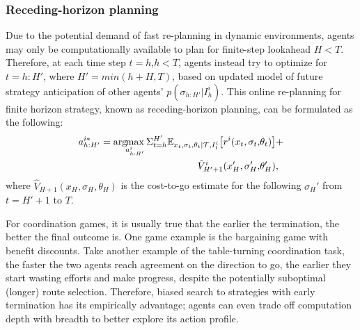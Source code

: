 \documentclass[letterpaper, 10 pt, conference]{ieeeconf}  %
\newcommand{\argmax}{\arg\!\!\max}
\begin{document}
\subsubsection{Receding-horizon planning}\label{sec:receding}
Due to the potential demand of fast re-planning in dynamic environments, agents may only be computationally available to plan for finite-step lookahead $H<T$. Therefore, at each time step $t=h$,$h<T$, agents instead try to optimize for $t=h:H'$, where $H'=min(h+H,T)$, based on updated model of future strategy 
anticipation of other agents' $p(\sigma_{h:H'}|I^i_h)$. This online re-planning 
for finite horizon strategy, known as receding-horizon planning, can be formulated as the following:
\begin{equation}
  \begin{aligned}
  a^{i*}_{h:H'} = \argmax_{a^i_{h:H'}} 
  \Sigma_{t=h}^{H'} 
  \mathbb{E}_{x_t,\sigma_{t},\theta_t|\mathcal{T},I^i_t} \big{[}
    r^i(x_t,\sigma_t,&\theta_t)\big{]}+ \\
    \hat{V}^i_{H'+1}(x_H',\sigma_H',&\theta_H'), 
  \end{aligned}
  \end{equation}
where $\hat{V}_{H+1}(x_H,\sigma_H,\theta_H)$ is the cost-to-go estimate for the following $\sigma_H'$ from $t=H'+1$ to $T$.

For coordination games, it is usually true that the earlier the termination, 
the better the final outcome is. One game example is the bargaining game with 
benefit discounts. 
Take another example of the table-turning coordination task, the faster the two agents reach 
agreement on the direction to go, the earlier they start wasting efforts and make progress, despite the 
potentially suboptimal (longer) route selection. Therefore, biased search to 
strategies with early 
termination has its empirically advantage; agents can even trade off 
computation depth with breadth to better explore its action profile. 
\end{document}
